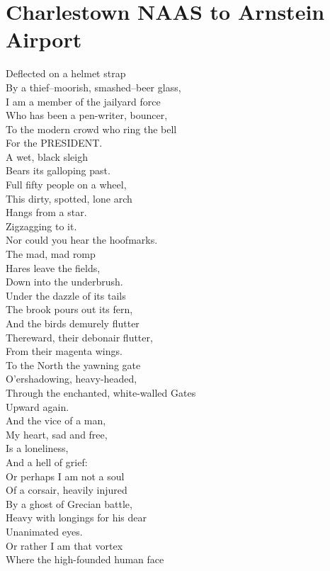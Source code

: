 \documentclass[smalldemyvopaper,11pt,twoside,onecolumn,openright,extrafontsizes]{memoir}
\begin{document}
\chapter{Charlestown NAAS to Arnstein Airport}
Deflected on a helmet strap
\\By a thief--moorish, smashed--beer glass,
\\I am a member of the jailyard force
\\Who has been a pen-writer, bouncer,
\\To the modern crowd who ring the bell
\\For the PRESIDENT.
\\A wet, black sleigh
\\Bears its galloping past.
\\Full fifty people on a wheel,
\\This dirty, spotted, lone arch
\\Hangs from a star.
\\Zigzagging to it.
\\Nor could you hear the hoofmarks.
\\The mad, mad romp
\\Hares leave the fields,
\\Down into the underbrush.
\\Under the dazzle of its tails
\\The brook pours out its fern,
\\And the birds demurely flutter
\\Thereward, their debonair flutter,
\\From their magenta wings.
\\To the North the yawning gate
\\O'ershadowing, heavy-headed,
\\Through the enchanted, white-walled Gates
\\Upward again.
\\And the vice of a man,
\\My heart, sad and free,
\\Is a loneliness,
\\And a hell of grief:
\\Or perhaps I am not a soul
\\Of a corsair, heavily injured
\\By a ghost of Grecian battle,
\\Heavy with longings for his dear
\\Unanimated eyes.
\\Or rather I am that vortex
\\Where the high-founded human face
\end{document}
